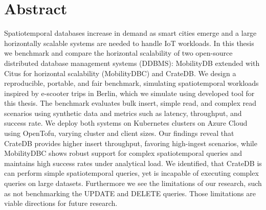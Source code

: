 \documentclass[a4paper, 11pt]{article}
\begin{document}


\newpage

\section*{Abstract}
Spatiotemporal databases increase in demand as smart cities emerge and a large horizontally scalable systems are needed to handle IoT workloads.
In this thesis we benchmark and compare the horizontal scalability of two open-source distributed database management systems (DDBMS): MobilityDB extended with Citus for horizontal scalability (MobilityDBC) and CrateDB.
We design a reproducible, portable, and fair benchmark, simulating spatiotemporal workloads inspired by e-scooter trips in Berlin, which we simulate using developed tool for this thesis.
The benchmark evaluates bulk insert, simple read, and complex read scenarios using synthetic data and metrics such as latency, throughput, and success rate.
We deploy both systems on Kubernetes clusters on Azure Cloud using OpenTofu, varying cluster and client sizes.
Our findings reveal that CrateDB provides higher insert throughput, favoring high-ingest scenarios, while MobilityDBC shows robust support for complex spatiotemporal queries and maintains high success rates under analytical load.
We identified, that CrateDB is can perform simple spatiotemporal queries, yet is incapable of executing complex queries on large datasets.
Furthermore we see the limitations of our research, such as not benchmarking the UPDATE and DELETE queries.
Those limitations are viable directions for future research.
\end{document}
